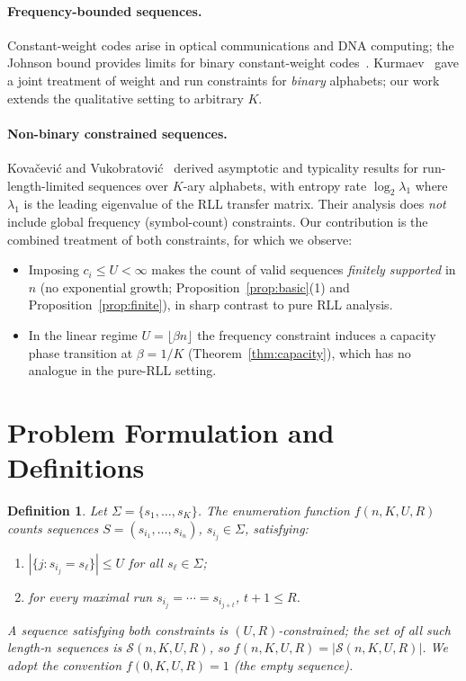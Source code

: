 \documentclass[a4paper,12pt]{article}
\newtheorem{definition}{Definition}
\begin{document}
\paragraph{Frequency-bounded sequences.}
Constant-weight codes arise in optical communications and DNA
computing; the Johnson bound provides limits for binary
constant-weight codes~\cite{johnson1962}.  Kurmaev~\cite{kurmaev2011}
gave a joint treatment of weight and run constraints for \emph{binary}
alphabets; our work extends the qualitative setting to arbitrary $K$.

\paragraph{Non-binary constrained sequences.}
Kova\v{c}evi\'{c} and Vukobratovi\'{c}~\cite{kovacevic2021} derived
asymptotic and typicality results for run-length-limited sequences
over $K$-ary alphabets, with entropy rate $\log_2\lambda_1$ where
$\lambda_1$ is the leading eigenvalue of the RLL transfer matrix.
Their analysis does \emph{not} include global frequency
(symbol-count) constraints.  Our contribution is the combined
treatment of both constraints, for which we observe:
\begin{itemize}
    \item Imposing $c_i\le U<\infty$ makes the count of valid
          sequences \emph{finitely supported} in $n$ (no exponential
          growth; Proposition~\ref{prop:basic}(1) and
          Proposition~\ref{prop:finite}), in sharp contrast to pure
          RLL analysis.
    \item In the linear regime $U=\lfloor\beta n\rfloor$ the frequency
          constraint induces a capacity phase transition at
          $\beta=1/K$ (Theorem~\ref{thm:capacity}), which has no
          analogue in the pure-RLL setting.
\end{itemize}

\section{Problem Formulation and Definitions}
\label{sec:problem}

\begin{definition}
Let $\Sigma = \{s_1,\ldots,s_K\}$.  The \emph{enumeration function}
$f(n,K,U,R)$ counts sequences $S=(s_{i_1},\ldots,s_{i_n})$,
$s_{i_j}\in\Sigma$, satisfying:
\begin{enumerate}
    \item $|\{j : s_{i_j}=s_\ell\}|\le U$ for all $s_\ell\in\Sigma$;
    \item for every maximal run $s_{i_j}=\cdots=s_{i_{j+t}}$,
          $t+1\le R$.
\end{enumerate}
A sequence satisfying both constraints is \emph{$(U,R)$-constrained};
the set of all such length-$n$ sequences is $\mathcal{S}(n,K,U,R)$, so
$f(n,K,U,R)=|\mathcal{S}(n,K,U,R)|$.  We adopt the convention
$f(0,K,U,R)=1$ (the empty sequence).
\end{definition}
\end{document}
